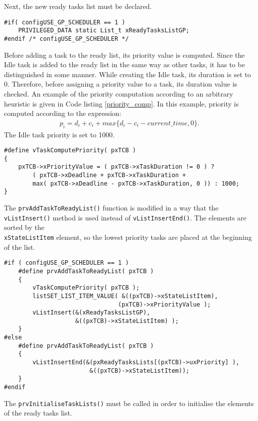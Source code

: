 Next, the new ready tasks list must be declared.
\begin{lstlisting}[frame=none, label={ready_list}, caption={Declaration of the new ready tasks list.}, captionpos=b]
#if( configUSE_GP_SCHEDULER == 1 )
	PRIVILEGED_DATA static List_t xReadyTasksListGP;
#endif /* configUSE_GP_SCHEDULER */
\end{lstlisting}
Before adding a task to the ready list, its priority value is computed. 
Since the Idle task is added to the ready list in the same way as other tasks, it has to be distinguished in some manner. 
While creating the Idle task, its duration is set to 0.
Therefore, before assigning a priority value to a task, its duration value is checked. 
An example of the priority computation according to an arbitrary heuristic is given in Code listing \ref{priority_comp}. 
In this example, priority is computed according to the expression:
\begin{align*}
p_i = d_i + c_i + max\{ d_i - c_i - current\_time, 0 \}.
\end{align*}
The Idle task priority is set to 1000.
\begin{lstlisting}[frame=none, label={priority_comp}, caption={Macro function for priority computation.}, captionpos=b]
#define vTaskComputePriority( pxTCB )
{
	pxTCB->xPriorityValue = ( pxTCB->xTaskDuration != 0 ) ? 
		( pxTCB->xDeadline + pxTCB->xTaskDuration + 
		max( pxTCB->xDeadline - pxTCB->xTaskDuration, 0 )) : 1000;
}	
\end{lstlisting}
The \verb$prvAddTaskToReadyList()$ function is modified in a way that the \verb$vListInsert()$ method is used instead of \verb$vListInsertEnd()$. 
The elements are sorted by the \\\verb$xStateListItem$ element, so the lowest priority tasks are placed at the beginning of the list. 
\begin{lstlisting}[frame=none, label={ready_add}, caption={Adding a new task to the ready list.}, captionpos=b]
#if ( configUSE_GP_SCHEDULER == 1 )
	#define prvAddTaskToReadyList( pxTCB )
	{
		vTaskComputePriority( pxTCB );
		listSET_LIST_ITEM_VALUE( &((pxTCB)->xStateListItem), 
								(pxTCB)->xPriorityValue );
		vListInsert(&(xReadyTasksListGP), 
					&((pxTCB)->xStateListItem) );
	}																								
#else 																								
	#define prvAddTaskToReadyList( pxTCB )
	{
		vListInsertEnd(&(pxReadyTasksLists[(pxTCB)->uxPriority] ), 
						&((pxTCB)->xStateListItem));
	}
#endif
\end{lstlisting}
The \verb$prvInitialiseTaskLists()$ must be called in order to initialise the elements of the ready tasks list.
